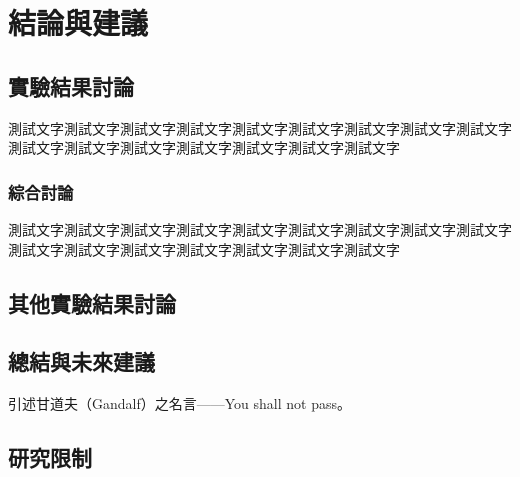 \chapter{結論與建議}
\label{c:conclusion}

\section{實驗結果討論}

測試文字測試文字測試文字測試文字測試文字測試文字測試文字測試文字測試文字測試文字測試文字測試文字測試文字測試文字測試文字測試文字

\subsection{綜合討論}

測試文字測試文字測試文字測試文字測試文字測試文字測試文字測試文字測試文字測試文字測試文字測試文字測試文字測試文字測試文字測試文字

\section{其他實驗結果討論}

\section{總結與未來建議}

引述甘道夫（Gandalf）之名言——You shall not pass。

\section{研究限制}
